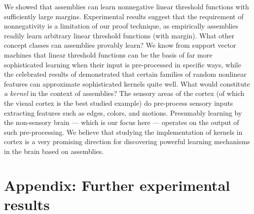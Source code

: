 \documentclass[final,12pt]{colt2022} %
\begin{document}
We showed that assemblies can learn nonnegative linear threshold functions with sufficiently large margins. Experimental results suggest that the requirement of nonnegativity is a limitation of our proof technique, as empirically assemblies readily learn arbitrary linear threshold functions (with margin). What other concept classes can assemblies provably learn?  We know from support vector machines that linear threshold functions can be the basis of far more sophisticated learning when their input is pre-processed in specific ways, while the celebrated results of \citet{rahimi2007random} demonstrated that certain families of random nonlinear features can approximate sophisticated kernels quite well. What would constitute {\em a kernel} in the context of assemblies? The sensory areas of the cortex (of which the visual cortex is the best studied example) do pre-process sensory inputs extracting features such as edges, colors, and motions. Presumably learning by the non-sensory brain --- which is our focus here --- operates on the output of such pre-processing. We believe that studying the implementation of kernels in cortex is a very promising direction for discovering powerful learning mechanisms in the brain based on assemblies.






\newpage
\appendix
\section*{Appendix: Further experimental results}\label{appendix:experiments}
\end{document}
